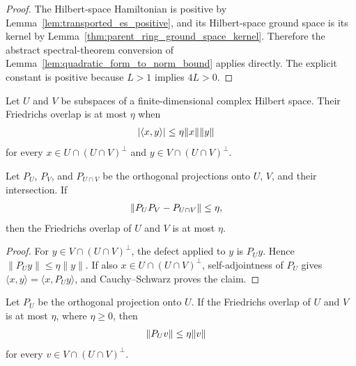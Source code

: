 \begin{proof}
    \leanok
    The Hilbert-space Hamiltonian is positive by
    Lemma~\ref{lem:transported_es_positive}, and its Hilbert-space ground
    space is its kernel by Lemma~\ref{thm:parent_ring_ground_space_kernel}.
    Therefore the abstract spectral-theorem conversion of
    Lemma~\ref{lem:quadratic_form_to_norm_bound} applies directly. The
    explicit constant is positive because $L>1$ implies $4L>0$.
\end{proof}

\begin{definition}
    \label{def:friedrichs_overlap_bound}
    \leanok
    Let $U$ and $V$ be subspaces of a finite-dimensional complex Hilbert space.
    Their Friedrichs overlap is at most $\eta$ when
    \begin{align}
        |\langle x,y\rangle|
         & \le \eta\|x\|\|y\| \notag
    \end{align}
    for every
    $x\in U\cap(U\cap V)^\perp$ and
    $y\in V\cap(U\cap V)^\perp$.
\end{definition}

\begin{lemma}
    \label{thm:projector_defect_to_friedrichs}
    \leanok
    Let $P_U$, $P_V$, and $P_{U\cap V}$ be the orthogonal projections onto
    $U$, $V$, and their intersection. If
    \begin{align}
        \|P_UP_V-P_{U\cap V}\| & \le\eta, \notag
    \end{align}
    then the Friedrichs overlap of $U$ and $V$ is at most $\eta$.
\end{lemma}

\begin{proof}
    \leanok
    For $y\in V\cap(U\cap V)^\perp$, the defect applied to $y$ is $P_Uy$.
    Hence $\|P_Uy\|\le\eta\|y\|$. If also
    $x\in U\cap(U\cap V)^\perp$, self-adjointness of $P_U$ gives
    $\langle x,y\rangle=\langle x,P_Uy\rangle$, and Cauchy--Schwarz proves
    the claim.
\end{proof}

\begin{lemma}
    \label{lem:two_projection_friedrichs_compression}
    \leanok
    Let $P_U$ be the orthogonal projection onto $U$. If the Friedrichs overlap
    of $U$ and $V$ is at most $\eta$, where $\eta\ge0$, then
    \begin{align}
        \|P_Uv\|
         & \le \eta\|v\| \notag
    \end{align}
    for every $v\in V\cap(U\cap V)^\perp$.
\end{lemma}

